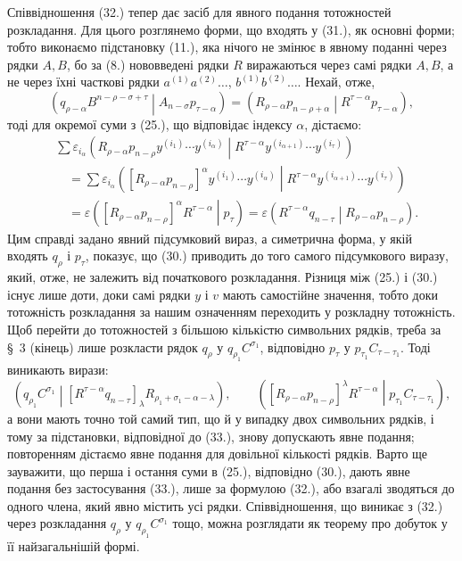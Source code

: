 \documentclass[11pt]{article}
\newcommand{\pair}[2]{\left(#1\middle|#2\right)}
\newcommand{\eps}{\varepsilon}
\begin{document}
Співвідношення (32.) тепер дає засіб для явного подання тотожностей розкладання. Для цього розглянемо форми, що входять у (31.), як основні форми; тобто виконаємо підстановку (11.), яка нічого не змінює в явному поданні через рядки $A,B$, бо за (8.) нововведені рядки $R$ виражаються через самі рядки $A,B$, а не через їхні часткові рядки $a^{(1)}a^{(2)}\ldots$, $b^{(1)}b^{(2)}\ldots$. Нехай, отже,
\begin{equation}
 \pair{q_{\rho-\alpha}B^{n-\rho-\sigma+\tau}}{A_{n-\sigma}p_{\tau-\alpha}}
 =\pair{R_{\rho-\alpha}p_{n-\rho+\alpha}}{R^{\tau-\alpha}p_{\tau-\alpha}},
\tag{33}
\end{equation}
тоді для окремої суми з (25.), що відповідає індексу $\alpha$, дістаємо:
\begin{equation}
\begin{aligned}
&\sum \eps_{i_\alpha}
\pair{R_{\rho-\alpha}p_{n-\rho}y^{(i_1)}\cdots y^{(i_\alpha)}}
{R^{\tau-\alpha}y^{(i_{\alpha+1})}\cdots y^{(i_\tau)}}\\
&\quad=\sum \eps_{i_\alpha}
\pair{[R_{\rho-\alpha}p_{n-\rho}]^\alpha
y^{(i_1)}\cdots y^{(i_\alpha)}}
{R^{\tau-\alpha}y^{(i_{\alpha+1})}\cdots y^{(i_\tau)}}\\
&\quad=\eps\pair{[R_{\rho-\alpha}p_{n-\rho}]^\alpha R^{\tau-\alpha}}{p_\tau}
 =\eps\pair{R^{\tau-\alpha}q_{n-\tau}}{R_{\rho-\alpha}p_{n-\rho}}.
\end{aligned}
\tag{34}
\end{equation}
Цим справді задано явний підсумковий вираз, а симетрична форма, у якій входять $q_\rho$ і $p_\tau$, показує, що (30.) приводить до того самого підсумкового виразу, який, отже, не залежить від початкового розкладання. Різниця між (25.) і (30.) існує лише доти, доки самі рядки $y$ і $v$ мають самостійне значення, тобто доки тотожність розкладання за нашим означенням переходить у розкладну тотожність. Щоб перейти до тотожностей з більшою кількістю символьних рядків, треба за \S\ 3 (кінець) лише розкласти рядок $q_\rho$ у $q_{\rho_1}C^{\sigma_1}$, відповідно $p_\tau$ у $p_{\tau_1}C_{\tau-\tau_1}$. Тоді виникають вирази:
\begin{equation}
 \pair{q_{\rho_1}C^{\sigma_1}}
 {[R^{\tau-\alpha}q_{n-\tau}]_\lambda R_{\rho_1+\sigma_1-\alpha-\lambda}},
 \qquad
 \pair{[R_{\rho-\alpha}p_{n-\rho}]^\lambda R^{\tau-\alpha}}
 {p_{\tau_1}C_{\tau-\tau_1}},
\tag{35}
\end{equation}
а вони мають точно той самий тип, що й у випадку двох символьних рядків, і тому за підстановки, відповідної до (33.), знову допускають явне подання; повторенням дістаємо явне подання для довільної кількості рядків. Варто ще зауважити, що перша і остання суми в (25.), відповідно (30.), дають явне подання без застосування (33.), лише за формулою (32.), або взагалі зводяться до одного члена, який явно містить усі рядки. Співвідношення, що виникає з (32.) через розкладання $q_\rho$ у $q_{\rho_1}C^{\sigma_1}$ тощо, можна розглядати як теорему про добуток у її найзагальнішій формі.
\end{document}
